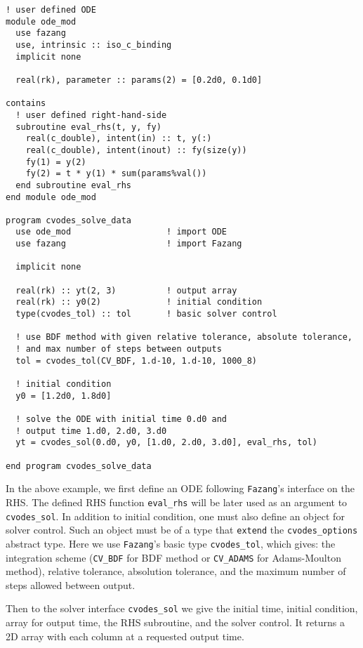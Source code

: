 \documentclass[12pt, reqno, oneside]{amsbook}
\numberwithin{equation}{chapter}
\begin{document}
\begin{verbatim}
! user defined ODE
module ode_mod
  use fazang
  use, intrinsic :: iso_c_binding
  implicit none

  real(rk), parameter :: params(2) = [0.2d0, 0.1d0]

contains
  ! user defined right-hand-side
  subroutine eval_rhs(t, y, fy)
    real(c_double), intent(in) :: t, y(:)
    real(c_double), intent(inout) :: fy(size(y))
    fy(1) = y(2)
    fy(2) = t * y(1) * sum(params%val())
  end subroutine eval_rhs
end module ode_mod

program cvodes_solve_data
  use ode_mod                   ! import ODE
  use fazang                    ! import Fazang

  implicit none

  real(rk) :: yt(2, 3)          ! output array
  real(rk) :: y0(2)             ! initial condition
  type(cvodes_tol) :: tol       ! basic solver control

  ! use BDF method with given relative tolerance, absolute tolerance,
  ! and max number of steps between outputs
  tol = cvodes_tol(CV_BDF, 1.d-10, 1.d-10, 1000_8)

  ! initial condition
  y0 = [1.2d0, 1.8d0]

  ! solve the ODE with initial time 0.d0 and
  ! output time 1.d0, 2.d0, 3.d0
  yt = cvodes_sol(0.d0, y0, [1.d0, 2.d0, 3.d0], eval_rhs, tol)

end program cvodes_solve_data
\end{verbatim}
In the above example, we first define an ODE following \texttt{Fazang}'s
interface on the RHS. The defined RHS function \texttt{eval\_rhs} will be later used as an
argument to \texttt{cvodes\_sol}. In addition to initial condition, one must
also define an object for solver control. Such an object must be of a
type that \texttt{extend} the \texttt{cvodes\_options} abstract type. Here we use \texttt{Fazang}'s
basic type \texttt{cvodes\_tol}, which gives: the integration scheme (\texttt{CV\_BDF}
for BDF method or \texttt{CV\_ADAMS} for Adams-Moulton method), relative
tolerance, absolution tolerance, and the maximum number of steps
allowed between output.

Then to the solver interface \texttt{cvodes\_sol} we give the initial time,
initial condition, array for output time, the RHS subroutine, and the
solver control. It returns a 2D array with each column at a requested
output time.
\end{document}
